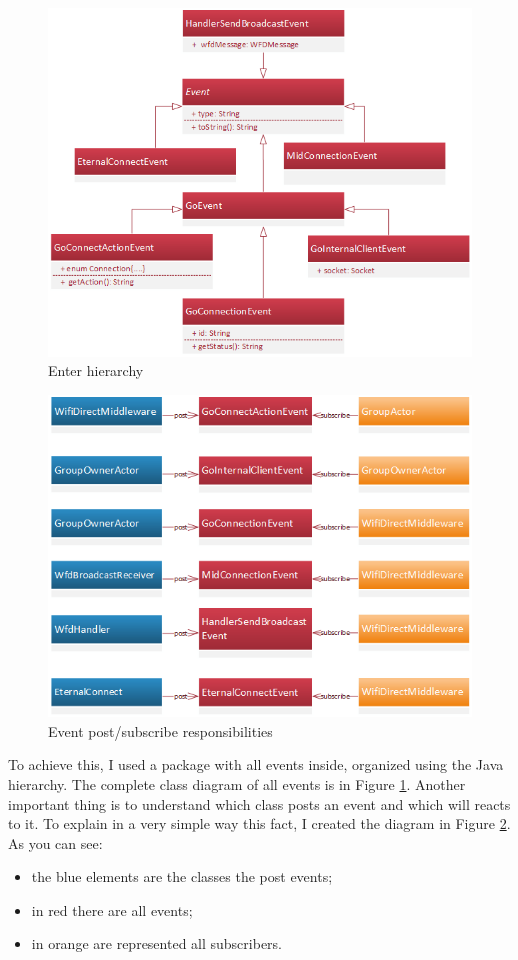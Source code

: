 \begin{figure}[thpb]
	\centering
	\includegraphics[scale=0.7]{./images/chap2/event-hyerarchy.png}
	\caption{Enter hierarchy}
	\label{event-hieranchy}
\end{figure}	

\begin{figure}[thpb]
	\centering
	\includegraphics[scale=0.7]{./images/chap2/event-subscribe-post.png}
	\caption{Event post/subscribe responsibilities}
	\label{event-subscribe-post}
\end{figure}	

To achieve this, I used a package with all events inside, organized using the Java hierarchy. The complete class diagram of all events is in Figure \ref{event-hieranchy}.
Another important thing is to understand which class posts an event and which will reacts to it. To explain in a very simple way this fact, I created the diagram in Figure \ref{event-subscribe-post}. As you can see:
\begin{itemize}
	\item the blue elements are the classes the post events;
	\item in red there are all events;
	\item in orange are represented all subscribers.
\end{itemize}

